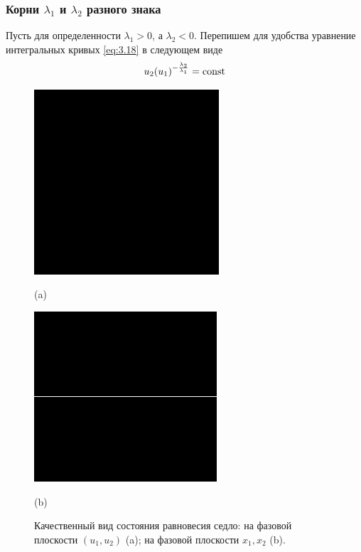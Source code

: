 \subsubsection{Корни $\lambda_1$ и $\lambda_2$ разного знака}%
\label{ssub:korni_lambda_1_i_lambda_2_raznogo_znaka}

Пусть для определенности $\lambda_1>0$, а $\lambda_2<0$. Перепишем для удобства уравнение интегральных кривых \eqref{eq:3.18} в следующем виде
\begin{equation}
        \label{eq:3.21}
        u_2(u_1)^{- \frac{\lambda_2}{\lambda_1}} = \textrm{const}   
\end{equation}
\begin{figure}[h!]
        \centering
        \begin{minipage}{0.45\linewidth}
                \centering  
                \includegraphics[]{fig/lect3/5a}

                (a)
        \end{minipage}
        \begin{minipage}{0.45\linewidth}
                \centering  
                \includegraphics[]{fig/lect3/5b}

                (b)
        \end{minipage}
        \caption{ Качественный вид состояния равновесия седло: на фазовой плоскости $(u_1,u_2)$ (a);
на фазовой плоскости $x_1,x_2$ (b).}
        \label{fig:3.5}
\end{figure}
